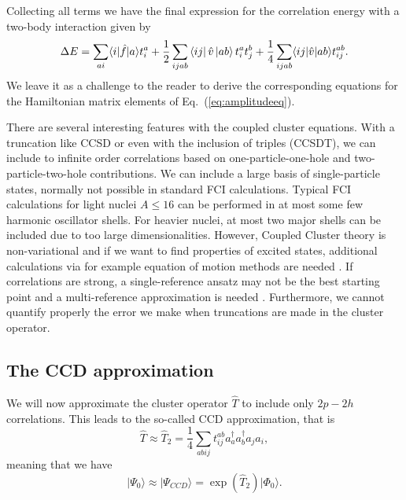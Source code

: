  Collecting all terms we have   the final expression for the correlation energy with a two-body interaction given by
  \begin{equation}\label{eq:energyccsd}
  \Delta E=\sum_{ai}\langle i| \hat{f}|a \rangle t_{i}^{a}+\frac{1}{2} \sum_{ijab} \bra{ij}\hat{v}\ket{ab} t_i^a t_j^b+
  \frac{1}{4}\sum_{ijab}\langle ij | \hat{v}| ab \rangle t_{ij}^{ab}.
  \end{equation}
We leave it as a challenge to the reader to derive the corresponding equations for the Hamiltonian matrix elements of Eq.~(\ref{eq:amplitudeeq}).


  There are several interesting features with the coupled cluster
  equations. With a truncation like CCSD or even with the inclusion of
  triples (CCSDT), we can include to infinite order correlations based
  on one-particle-one-hole and two-particle-two-hole contributions.
  We can include a large basis of single-particle states, normally not
  possible in standard FCI calculations. Typical FCI calculations for
  light nuclei $A\le 16$ can be performed in at most some few harmonic
  oscillator shells. For heavier nuclei, at most two major shells can
  be included due to too large dimensionalities.  However, Coupled
  Cluster theory is non-variational and if we want to find properties
  of excited states, additional calculations via for example equation
  of motion methods are needed \cite{shavittbartlett2009,Hagen:2015yea}.
  If correlations are strong, a single-reference ansatz may not be the
  best starting point and a multi-reference approximation is needed
  \cite{jansen2015}. Furthermore, we cannot quantify properly the
  error we make when truncations are made in the cluster operator.

  \subsection{The CCD approximation}

  We will now approximate the cluster operator $\hat{T}$ to include
  only $2p-2h$ correlations. This leads to the so-called CCD
  approximation, that is
  \[
  \hat{T}\approx
  \hat{T}_2=\frac{1}{4}\sum_{abij}t_{ij}^{ab}a^{\dagger}_aa^{\dagger}_ba_ja_i,
  \]
  meaning that we have
  \[
  \vert \Psi_0 \rangle \approx \vert \Psi_{CCD} \rangle =
  \exp{\left(\hat{T}_2\right)}\vert \Phi_0\rangle.
  \]

